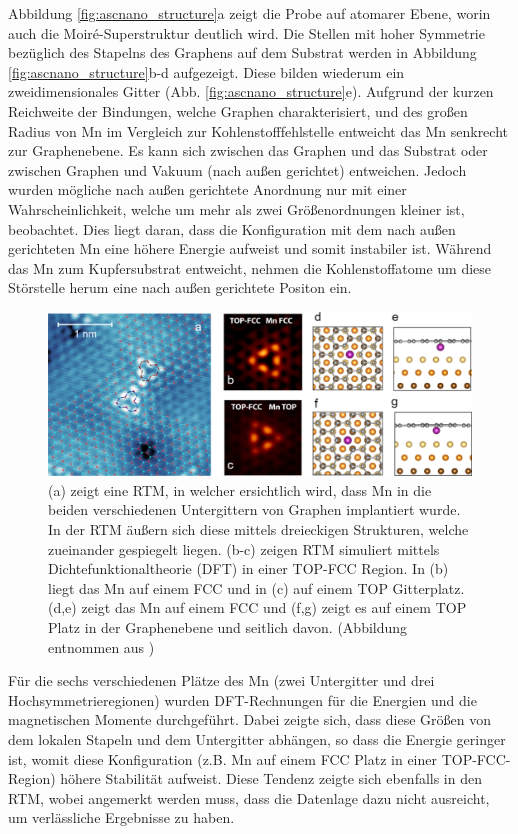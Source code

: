 Abbildung \ref{fig:ascnano_structure}a zeigt die Probe auf atomarer Ebene, worin auch die Moiré-Superstruktur deutlich wird.
Die Stellen mit hoher Symmetrie bezüglich des Stapelns des Graphens auf dem Substrat werden in 
Abbildung \ref{fig:ascnano_structure}b-d aufgezeigt.
Diese bilden wiederum ein zweidimensionales Gitter (Abb. \ref{fig:ascnano_structure}e).
Aufgrund der kurzen Reichweite der Bindungen, welche Graphen charakterisiert, und des großen Radius von Mn im Vergleich zur 
Kohlenstofffehlstelle entweicht das Mn senkrecht zur Graphenebene.
Es kann sich zwischen das Graphen und das Substrat oder zwischen Graphen und Vakuum (nach außen gerichtet) entweichen. 
Jedoch wurden mögliche nach außen gerichtete Anordnung nur mit einer Wahrscheinlichkeit, 
welche um mehr als zwei Größenordnungen kleiner ist, beobachtet.
Dies liegt daran, dass die Konfiguration mit dem nach außen gerichteten Mn eine höhere Energie aufweist und somit instabiler ist.
Während das Mn zum Kupfersubstrat entweicht, nehmen die Kohlenstoffatome um diese Störstelle herum eine nach außen gerichtete Positon ein.
\begin{figure}
    \centering
    \includegraphics[width = \textwidth]{Plots/images_large_nn1c00139_0003.jpeg}
    \caption{(a) zeigt eine RTM, in welcher ersichtlich wird, dass Mn in die beiden verschiedenen Untergittern von Graphen implantiert wurde. In der
    RTM äußern sich diese mittels dreieckigen Strukturen, welche zueinander gespiegelt liegen.
    (b-c) zeigen RTM simuliert mittels Dichtefunktionaltheorie (DFT) in einer TOP-FCC Region. In (b) liegt das Mn auf einem FCC
    und in (c) auf einem TOP Gitterplatz. (d,e) zeigt das Mn auf einem FCC und (f,g) zeigt es auf einem TOP Platz in der Graphenebene und seitlich davon.
    (Abbildung entnommen  aus \cite{doi:10.1021/acsnano.1c00139})}
    \label{fig:ascnano_defect}
\end{figure}
Für die sechs verschiedenen Plätze des Mn (zwei Untergitter und drei Hochsymmetrieregionen) wurden DFT-Rechnungen für die Energien und die magnetischen Momente durchgeführt.
Dabei zeigte sich, dass diese Größen von dem lokalen Stapeln und dem Untergitter abhängen, so dass die Energie geringer ist, womit 
diese Konfiguration (z.B. Mn auf einem FCC Platz in einer TOP-FCC-Region) höhere Stabilität aufweist.
Diese Tendenz zeigte sich ebenfalls in den RTM, wobei angemerkt werden muss, dass die Datenlage dazu nicht ausreicht, um
verlässliche Ergebnisse zu haben.  
\newpage
\FloatBarrier
